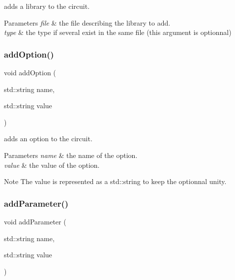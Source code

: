 adds a library to the circuit. 


\begin{DoxyParams}{Parameters}
{\em file} & the file describing the library to add. \\
\hline
{\em type} & the type if several exist in the same file (this argument is optionnal) \\
\hline
\end{DoxyParams}
\mbox{\label{class_s_p_i_c_e_1_1_circuit_a1abe34b48e2b6e1834a143fdef159cb9}} 
\subsubsection{\texorpdfstring{add\+Option()}{addOption()}}
{\footnotesize\ttfamily void add\+Option (\begin{DoxyParamCaption}\item[{std\+::string}]{name,  }\item[{std\+::string}]{value }\end{DoxyParamCaption})}



adds an option to the circuit. 


\begin{DoxyParams}{Parameters}
{\em name} & the name of the option. \\
\hline
{\em value} & the value of the option.\\
\hline
\end{DoxyParams}
\begin{DoxyNote}{Note}
The value is represented as a std\+::string to keep the optionnal unity. 
\end{DoxyNote}
\mbox{\label{class_s_p_i_c_e_1_1_circuit_ab3ab147a16bc490ce96db905a4ca271c}} 
\subsubsection{\texorpdfstring{add\+Parameter()}{addParameter()}}
{\footnotesize\ttfamily void add\+Parameter (\begin{DoxyParamCaption}\item[{std\+::string}]{name,  }\item[{std\+::string}]{value }\end{DoxyParamCaption})\hspace{0.3cm}{\ttfamily [inline]}}



